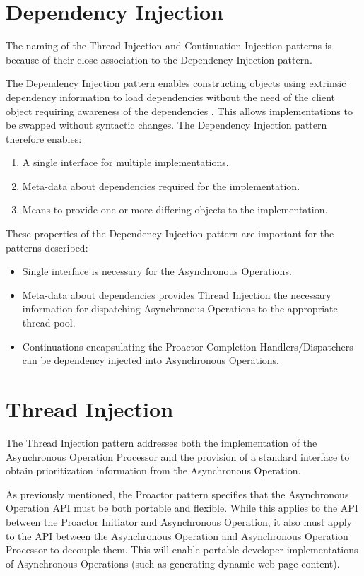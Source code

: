 \documentclass[prodmode]{style/acmlarge}
\begin{document}
\section{Dependency Injection}

The naming of the Thread Injection and Continuation Injection patterns is because
of their close association to the Dependency Injection pattern.

The Dependency Injection pattern enables constructing objects using extrinsic
dependency information to load dependencies without the need of the client
object requiring awareness of the dependencies \cite{ioc}.  This allows
implementations to be swapped without syntactic changes. The Dependency
Injection pattern therefore enables:

\begin{enumerate}
  \item A single interface for multiple implementations.
  \item Meta-data about dependencies required for the implementation.
  \item Means to provide one or more differing objects to the implementation.
\end{enumerate}

These properties of the Dependency Injection pattern are important for the
patterns described:
\begin{itemize}
  \item Single interface is necessary for the Asynchronous Operations.
  \item Meta-data about dependencies provides Thread Injection the necessary information for dispatching Asynchronous Operations to the appropriate thread pool.
  \item Continuations encapsulating the Proactor Completion Handlers/Dispatchers can be dependency injected into Asynchronous Operations.
\end{itemize}


\section{Thread Injection}

The Thread Injection pattern addresses both the implementation of the
Asynchronous Operation Processor and the provision of a standard interface to
obtain prioritization information from the Asynchronous Operation.

As previously mentioned, the Proactor pattern specifies that the Asynchronous
Operation API must be both portable and flexible.  While this applies to the API
between the Proactor Initiator and Asynchronous Operation, it also must apply to
the API between the Asynchronous Operation and Asynchronous Operation Processor
to decouple them.  This will enable portable developer implementations of
Asynchronous Operations (such as generating dynamic web page content). 
\end{document}
